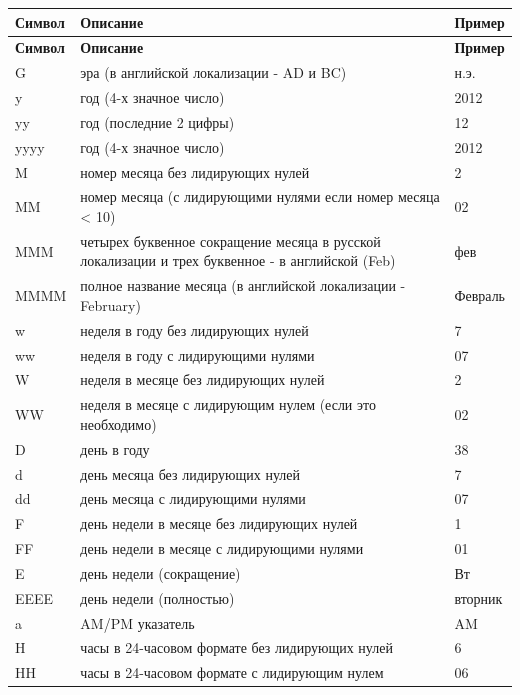 \begin{longtable}[r]{|>{\ttfamily\centering}m{1.8cm}|m{11.7cm}|m{1.8cm}|}
	\hline
	\centering\normalfont\bfseries Символ &
	\centering\normalfont\bfseries Описание &
	\centering\arraybslash\bfseries Пример\\\hline
	\endfirsthead
	\hline
	\centering\normalfont\bfseries Символ &
	\centering\normalfont\bfseries Описание &
	\centering\arraybslash\bfseries Пример \\\hline
	\endhead
	\hline
	G &  эра (в английской локализации - AD и BC) & н.э. \\\hline
	y & год (4-х значное число) & 2012 \\\hline
	yy & год (последние 2 цифры) & 12 \\\hline
	yyyy & год (4-х значное число) & 2012 \\\hline
	M & номер месяца без лидирующих нулей & 2 \\\hline
	MM & номер месяца (с лидирующими нулями если номер месяца < 10) & 02 \\\hline
	MMM & четырех буквенное сокращение месяца в русской локализации и трех буквенное - в английской (Feb) & фев \\\hline
	MMMM & полное название месяца (в английской локализации - February) & Февраль \\\hline
	w & неделя в году без лидирующих нулей & 7 \\\hline
	ww & неделя в году с лидирующими нулями & 07 \\\hline
	W & неделя в месяце без лидирующих нулей & 2 \\\hline
	WW & неделя в месяце с лидирующим нулем (если это необходимо) & 02 \\\hline
	D & день в году & 38 \\\hline
	d & день месяца без лидирующих нулей & 7 \\\hline
	dd & день месяца с лидирующими нулями & 07 \\\hline
	F & день недели в месяце без лидирующих нулей & 1 \\\hline
	FF & день недели в месяце с лидирующими нулями & 01 \\\hline
	E & день недели (сокращение) & Вт \\\hline
	EEEE & день недели (полностью) & вторник \\\hline
	a & AM/PM указатель & AM \\\hline
	H & часы в 24-часовом формате без лидирующих нулей & 6 \\\hline
	HH & часы в 24-часовом формате с лидирующим нулем & 06 \\\hline

\end{longtable}
